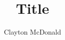 \documentclass{article}
\title{Title}
\author{Clayton McDonald}
\begin{document}
\maketitle
\vfill
\end{document}
